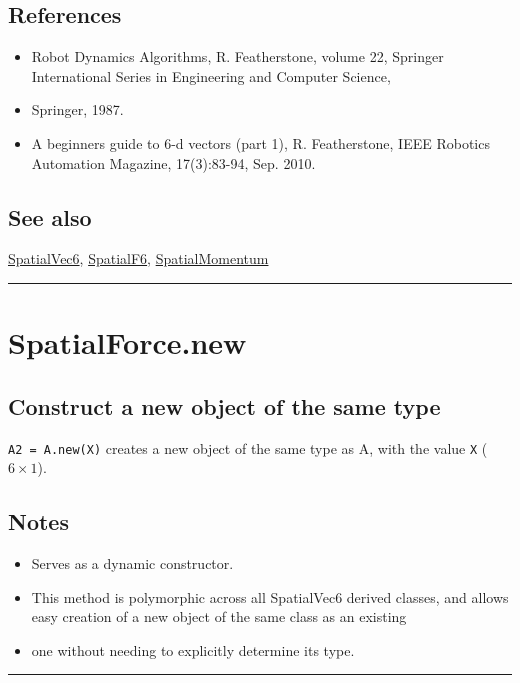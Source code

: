 \subsection*{References}
\begin{itemize}
  \item Robot Dynamics Algorithms, R. Featherstone, volume 22,     Springer International Series in Engineering and Computer Science,
  \item Springer, 1987.
  \item A beginner\textquotesingle s guide to 6-d vectors (part 1), R. Featherstone,     IEEE Robotics Automation Magazine, 17(3):83-94, Sep. 2010.
\end{itemize}

\subsection*{See also}


\hyperlink{SpatialVec6}{\color{blue} SpatialVec6}, \hyperlink{SpatialF6}{\color{blue} SpatialF6}, \hyperlink{SpatialMomentum}{\color{blue} SpatialMomentum}

\vspace{1.5ex}\hrule

\hypertarget{SpatialForce.new}{\section*{SpatialForce.new}}
\subsection*{Construct a new object of the same type}


\texttt{A2 = A.new(X)} creates a new object of the same type as A, with the value
\texttt{X} ($6 \times 1$).


\subsection*{Notes}
\begin{itemize}
  \item Serves as a dynamic constructor.
  \item This method is polymorphic across all SpatialVec6 derived classes, and     allows easy creation of a new object of the same class as an existing
  \item one without needing to explicitly determine its type.
\end{itemize}
\vspace{1.5ex}\rule{\textwidth}{1mm}

